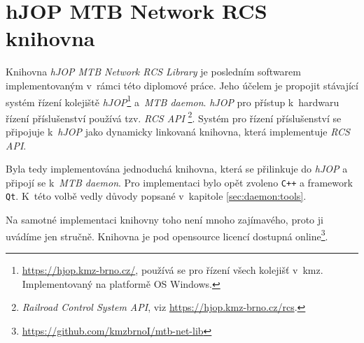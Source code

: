 \newpage
\section{hJOP MTB Network RCS knihovna} \label{sec:mtb-net-lib}

Knihovna \textit{hJOP MTB Network RCS Library} je posledním softwarem implementovaným
v~rámci této diplomové práce. Jeho účelem je propojit stávající systém řízení
kolejiště \textit{hJOP}\footnote{\url{https://hjop.kmz-brno.cz/}, používá se
pro řízení všech kolejišť v~\gls{kmz}. Implementovaný na platformě OS Windows.}
a~\textit{MTB daemon}. \textit{hJOP} pro přístup k~hardwaru řízení
příslušenství používá tzv. \textit{RCS API} \footnote{\textit{Railroad Control
System API}, viz \url{https://hjop.kmz-brno.cz/rcs}.}. Systém pro řízení
příslušenství se připojuje k~\textit{hJOP} jako dynamicky linkovaná knihovna,
která implementuje \textit{RCS API}.

Byla tedy implementována jednoduchá knihovna, která se přilinkuje do
\textit{hJOP} a připojí se k~\textit{MTB daemon}. Pro implementaci bylo
opět zvoleno \texttt{C++} a framework \texttt{Qt}. K~této volbě vedly důvody
popsané v~kapitole \ref{sec:daemon:tools}.

Na samotné implementaci knihovny toho není mnoho zajímavého, proto ji uvádíme
jen stručně. Knihovna je pod opensource licencí dostupná
online\footnote{\url{https://github.com/kmzbrnoI/mtb-net-lib}}.
